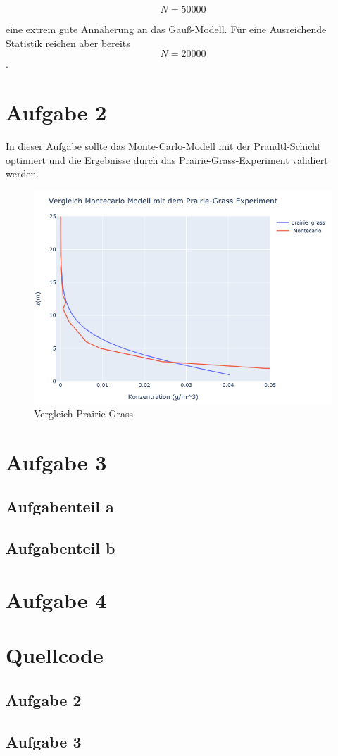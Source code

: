 \documentclass[ngerman]{scrartcl}
\begin{document}
\begin{equation}
	N=50000
\end{equation}

eine extrem gute Annäherung an das Gauß-Modell. Für eine Ausreichende Statistik reichen aber bereits 
\begin{equation}
	N=20000
\end{equation}.
\section{Aufgabe 2}
In dieser Aufgabe sollte das Monte-Carlo-Modell mit der Prandtl-Schicht optimiert und die Ergebnisse durch das Prairie-Grass-Experiment validiert werden.
\begin{figure}[H]
	\centering
	\includegraphics[scale=0.5]{Bilder/2back.png}
	\caption{Vergleich Prairie-Grass}
	\label{fig:my_label}
\end{figure}
\section{Aufgabe  3}
\subsection{Aufgabenteil a}
\subsection{Aufgabenteil b}
\section{Aufgabe  4}

\section{Quellcode}
\subsection{Aufgabe 2}

\subsection{Aufgabe 3}
\end{document}
